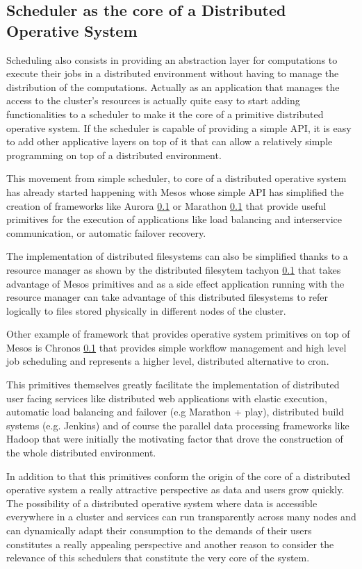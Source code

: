 \documentclass{svjour3}                     %
\begin{document}
\subsection{Scheduler as the core of a Distributed Operative System}

Scheduling also consists in providing an abstraction layer for
computations to execute their jobs in a distributed environment
without having to manage the distribution of the
computations. Actually as an application that manages the access to
the cluster's resources is actually quite easy to start adding
functionalities to a scheduler to make it the core of a primitive
distributed operative system. If the scheduler is capable of providing
a simple API, it is easy to add other applicative layers on top of
it that can allow a relatively simple programming on top of a
distributed environment.

This movement from simple scheduler, to core of a distributed
operative system has already started happening with Mesos whose simple
API has simplified the creation of frameworks like Aurora \ref{} or
Marathon \ref{} that provide useful primitives for the execution
of applications like load balancing and interservice communication,
or automatic failover recovery.

The implementation of distributed filesystems can also be simplified
thanks to a resource manager as shown by the distributed filesytem
tachyon \ref{} that takes advantage of Mesos primitives and as a side
effect application running with the resource manager can take
advantage of this distributed filesystems to refer logically to
files stored physically in different nodes of the cluster.

Other example of framework that provides operative system primitives
on top of Mesos is Chronos \ref{} that provides simple workflow
management and high level job scheduling and represents a higher
level, distributed alternative to cron.

This primitives themselves greatly facilitate the implementation of
distributed user facing services like distributed web applications
with elastic execution, automatic load balancing and failover (e.g
Marathon + play), distributed build systems (e.g. Jenkins) and of
course the parallel data processing frameworks like Hadoop that were
initially the motivating factor that drove the construction of the
whole distributed environment.

In addition to that this primitives conform the origin of the core of
a distributed operative system a really attractive perspective as data
and users grow quickly. The possibility of a distributed operative
system where data is accessible everywhere in a cluster and services
can run transparently across many nodes and can dynamically adapt
their consumption to the demands of their users constitutes a really
appealing perspective and another reason to consider the relevance of
this schedulers that constitute the very core of the system.
\end{document}
